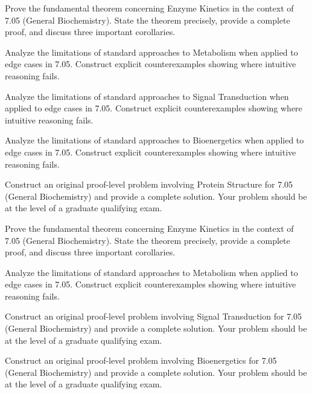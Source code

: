 \documentclass[12pt,a4paper]{exam}
\begin{document}
\begin{questions}
\vspace{0.3cm}

\question[7]
Prove the fundamental theorem concerning Enzyme Kinetics in the context of 7.05 (General Biochemistry). State the theorem precisely, provide a complete proof, and discuss three important corollaries.

\vspace{0.3cm}

\question[3]
Analyze the limitations of standard approaches to Metabolism when applied to edge cases in 7.05. Construct explicit counterexamples showing where intuitive reasoning fails.

\vspace{0.3cm}

\question[4]
Analyze the limitations of standard approaches to Signal Transduction when applied to edge cases in 7.05. Construct explicit counterexamples showing where intuitive reasoning fails.

\vspace{0.3cm}

\question[4]
Analyze the limitations of standard approaches to Bioenergetics when applied to edge cases in 7.05. Construct explicit counterexamples showing where intuitive reasoning fails.

\vspace{0.3cm}

\question[2]
Construct an original proof-level problem involving Protein Structure for 7.05 (General Biochemistry) and provide a complete solution. Your problem should be at the level of a graduate qualifying exam.

\vspace{0.3cm}

\question[4]
Prove the fundamental theorem concerning Enzyme Kinetics in the context of 7.05 (General Biochemistry). State the theorem precisely, provide a complete proof, and discuss three important corollaries.

\vspace{0.3cm}

\question[2]
Analyze the limitations of standard approaches to Metabolism when applied to edge cases in 7.05. Construct explicit counterexamples showing where intuitive reasoning fails.

\vspace{0.3cm}

\question[5]
Construct an original proof-level problem involving Signal Transduction for 7.05 (General Biochemistry) and provide a complete solution. Your problem should be at the level of a graduate qualifying exam.

\vspace{0.3cm}

\question[4]
Construct an original proof-level problem involving Bioenergetics for 7.05 (General Biochemistry) and provide a complete solution. Your problem should be at the level of a graduate qualifying exam.

\vspace{0.3cm}

\end{questions}
\end{document}
